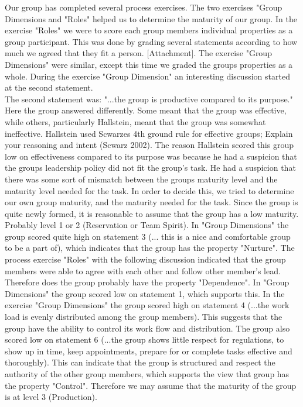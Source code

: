 Our group has completed several process exercises. The two exercises "Group Dimensions and "Roles" helped us to determine the  maturity of our group. In the exercise "Roles" we were to score each group members individual properties as a group participant. This was done by grading several statements according to how much we agreed that they fit a person. [Attachment]. The exercise "Group Dimensions" were similar, except this time we graded the groups properties as a whole. During the exercise "Group Dimension" an interesting discussion started at the second statement. 
\\
The second statement was: "...the group is productive compared to its purpose." Here the group answered differently. Some meant that the group was effective, while others, particularly Hallstein, meant that the group was somewhat ineffective. Hallstein used Scwarzes 4th ground rule for effective groups; Explain your reasoning and intent (Scwarz 2002). The reason Hallstein scored this group low on effectiveness compared to its purpose was because he had a suspicion that the groups leadership policy did not fit the group's task. He had a suspicion that there was some sort of mismatch between the groups maturity level and the maturity level needed for the task. In order to decide this, we tried to determine our own group maturity, and the maturity needed for the task.  
	Since the group is quite newly formed, it is reasonable to assume that the group has a low maturity. Probably level 1 or 2 (Reservation or Team Spirit). In "Group Dimensions" the group scored quite high on statement 3 (... this is a nice and comfortable group to be a part of), which indicates that the group has the property "Nurture". The process exercise "Roles" with the following discussion indicated that the group members were able to agree with each other and follow other member's lead. Therefore does the group probably have the property "Dependence". In "Group Dimensions" the group scored low on statement 1, which supports this. 
	In the exercise "Group Dimensions" the group scored high on statement 4 (...the work load is evenly distributed among the group members). This suggests that the group have the ability to control its work flow and distribution. The group also scored low on statement 6 (...the group shows little respect for regulations, to show up in time, keep appointments, prepare for or complete tasks effective and thoroughly). This can indicate that the group is structured and respect the authority of the other group members, which supports the view that group has the property "Control". Therefore we may assume that the maturity of the group is at level 3 (Production).
